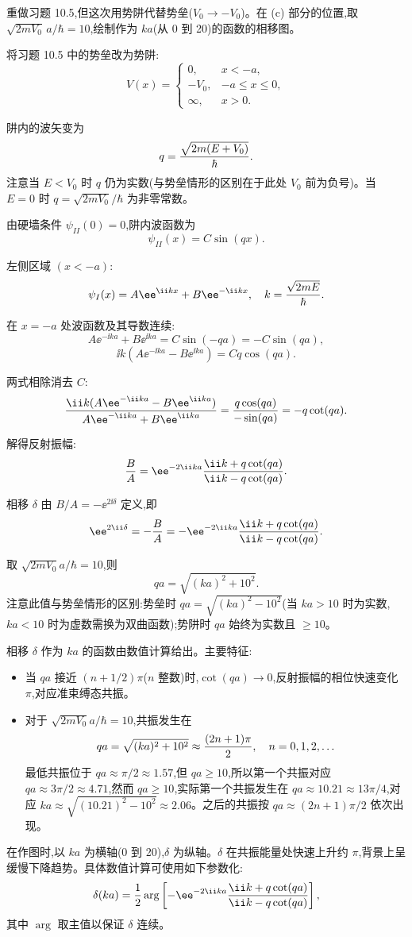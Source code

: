\begin{question}
重做习题 10.5,但这次用势阱代替势垒($V_0\to -V_0$)。在 (c) 部分的位置,取 $\sqrt{2mV_0}\,a/\hbar=10$,绘制作为 $ka$(从 0 到 20)的函数的相移图。
\end{question}
\begin{solution}
将习题 10.5 中的势垒改为势阱:
\[
V(x)=\begin{cases}
0,&x<-a,\\
-V_0,&-a\le x\le 0,\\
\infty,&x>0.
\end{cases}
\]

阱内的波矢变为
\[
q={\sqrt{2m(E+V_0)}\over\hbar}.
\]
注意当 $E<V_0$ 时 $q$ 仍为实数(与势垒情形的区别在于此处 $V_0$ 前为负号)。当 $E=0$ 时 $q=\sqrt{2mV_0}/\hbar$ 为非零常数。

由硬墙条件 $\psi_{II}(0)=0$,阱内波函数为
\[
\psi_{II}(x)=C\sin(qx).
\]

左侧区域 $(x<-a)$:
\[
\psi_I(x)=A\ee^{\ii kx}+B\ee^{-\ii kx},\quad k={\sqrt{2mE}\over\hbar}.
\]

在 $x=-a$ 处波函数及其导数连续:
\[
A\ee^{-\ii ka}+B\ee^{\ii ka}=C\sin(-qa)=-C\sin(qa),
\]
\[
\ii k(A\ee^{-\ii ka}-B\ee^{\ii ka})=Cq\cos(qa).
\]

两式相除消去 $C$:
\[
{\ii k(A\ee^{-\ii ka}-B\ee^{\ii ka})\over A\ee^{-\ii ka}+B\ee^{\ii ka}}={q\cos(qa)\over-\sin(qa)}=-q\cot(qa).
\]

解得反射振幅:
\[
{B\over A}=\ee^{-2\ii ka}{\ii k+q\cot(qa)\over\ii k-q\cot(qa)}.
\]

相移 $\delta$ 由 $B/A=-\ee^{2\ii\delta}$ 定义,即
\[
\ee^{2\ii\delta}=-{B\over A}=-\ee^{-2\ii ka}{\ii k+q\cot(qa)\over\ii k-q\cot(qa)}.
\]

取 $\sqrt{2mV_0}a/\hbar=10$,则
\[
qa=\sqrt{(ka)^2+10^2}.
\]
注意此值与势垒情形的区别:势垒时 $qa=\sqrt{(ka)^2-10^2}$(当 $ka>10$ 时为实数,$ka<10$ 时为虚数需换为双曲函数);势阱时 $qa$ 始终为实数且 $\ge10$。

相移 $\delta$ 作为 $ka$ 的函数由数值计算给出。主要特征:
\begin{itemize}
\item 当 $q a$ 接近 $(n+1/2)\pi$($n$ 整数)时,$\cot(qa)\to0$,反射振幅的相位快速变化 $\pi$,对应准束缚态共振。
\item 对于 $\sqrt{2mV_0}a/\hbar=10$,共振发生在
\[
qa=\sqrt{(ka)^2+10^2}\approx {(2n+1)\pi\over2},\quad n=0,1,2,\ldots
\]
最低共振位于 $qa\approx\pi/2\approx1.57$,但 $qa\ge10$,所以第一个共振对应 $qa\approx 3\pi/2\approx4.71$,然而 $qa\ge10$,实际第一个共振发生在 $qa\approx 10.21\approx13\pi/4$,对应 $ka\approx\sqrt{(10.21)^2-10^2}\approx2.06$。之后的共振按 $qa\approx (2n+1)\pi/2$ 依次出现。
\end{itemize}

在作图时,以 $ka$ 为横轴(0 到 20),$\delta$ 为纵轴。$\delta$ 在共振能量处快速上升约 $\pi$,背景上呈缓慢下降趋势。具体数值计算可使用如下参数化:
\[
\delta(ka)={1\over2}\arg\left[-\ee^{-2\ii ka}{\ii k+q\cot(qa)\over\ii k-q\cot(qa)}\right],
\]
其中 $\arg$ 取主值以保证 $\delta$ 连续。
\end{solution}
